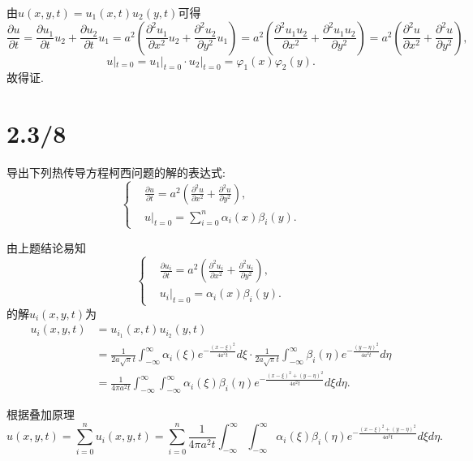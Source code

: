\documentclass[11pt,a4paper]{article}
\begin{document}
由$u(x,y,t)=u_1(x,t)u_2(y,t)$可得
$$\frac{\partial u}{\partial t}=\frac{\partial u_1}{\partial t}u_2+\frac{\partial u_2}{\partial t}u_1=a^2\left(\frac{\partial^2u_1}{\partial x^2}u_2+\frac{\partial^2u_2}{\partial y^2}u_1\right)=a^2\left(\frac{\partial^2u_1u_2}{\partial x^2}+\frac{\partial^2u_1u_2}{\partial y^2}\right)=a^2\left(\frac{\partial^2u}{\partial x^2}+\frac{\partial^2u}{\partial y^2}\right),$$
$$u|_{t=0}=u_1|_{t=0}\cdot u_2|_{t=0}=\varphi_1(x)\varphi_2(y).$$
故得证.

\section{2.3/8}
\begin{problem}
导出下列热传导方程柯西问题的解的表达式:
$$\left\{\begin{aligned}
     & \frac{\partial u}{\partial t}=a^2\left(\frac{\partial^2u}{\partial x^2}+\frac{\partial^2u}{\partial y^2}\right), \\
     & u|_{t=0}=\sum_{i=0}^n\alpha_i(x)\beta_i(y).
  \end{aligned}\right.$$
\end{problem}

由上题结论易知
$$\left\{\begin{aligned}
     & \frac{\partial u_i}{\partial t}=a^2\left(\frac{\partial^2u_i}{\partial x^2}+\frac{\partial^2u_i}{\partial y^2}\right), \\
     & u_i|_{t=0}=\alpha_i(x)\beta_i(y).
  \end{aligned}\right.$$
的解$u_i(x,y,t)$为
\begin{align*}
  u_i(x,y,t)
   & =u_{i_1}(x,t)u_{i_2}(y,t)                                                                                                                  \\
   & =\frac{1}{2a\sqrt{\pi}t}\int_{-\infty}^\infty\alpha_i(\xi)e^{-\frac{(x-\xi)^2}{4a^2t}}d\xi
  \cdot\frac{1}{2a\sqrt{\pi}t}\int_{-\infty}^\infty\beta_i(\eta)e^{-\frac{(y-\eta)^2}{4a^2t}}d\eta                                              \\
   & =\frac{1}{4\pi a^2t}\int_{-\infty}^\infty\int_{-\infty}^\infty\alpha_i(\xi)\beta_i(\eta)e^{-\frac{(x-\xi)^2+(y-\eta)^2}{4a^2t}}d\xi d\eta.
\end{align*}

根据叠加原理
$$u(x,y,t)=\sum_{i=0}^n u_i(x,y,t)=\sum_{i=0}^n\frac{1}{4\pi a^2t}\int_{-\infty}^\infty\int_{-\infty}^\infty\alpha_i(\xi)\beta_i(\eta)e^{-\frac{(x-\xi)^2+(y-\eta)^2}{4a^2t}}d\xi d\eta.$$
\end{document}
